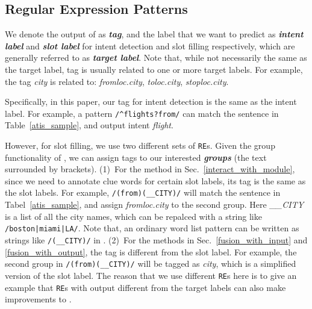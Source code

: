 \subsection{Regular Expression Patterns}
\label{re_desc}
We denote the output of \RE as \textbf{\emph{\RE tag}}, and the label that we want to predict as \textbf{\emph{intent label}} and \textbf{\emph{slot label}} for intent detection and slot filling respectively, which are generally referred to as \textbf{\emph{target label}}. 
Note that, while not necessarily the same as the target label, \RE tag is usually related to one or more target labels. For example, the \RE tag \emph{city} is related to: \emph{fromloc.city}, \emph{toloc.city}, \emph{stoploc.city}.

Specifically, in this paper, our \RE tag for intent detection is the same as the intent label. For example, a pattern 
\texttt{/\textasciicircum flights?\:from/} can match the sentence in Table~\ref{atis_sample}, and output intent \emph{flight}. 

However, for slot filling, we use two different sets of \texttt{RE}s. 
Given the group functionality of \RE, we can assign tags to our interested \textbf{\emph{\RE groups}} (the text surrounded by brackets). 
(1)~For the method in Sec.~\ref{interact_with_module}, since we need to annotate clue words for certain slot labels, its \RE tag is the same as the slot labels. 
For example, \texttt{/(from)\:(\_\_CITY)/} will match the sentence in Tabel~\ref{atis_sample}, and assign \emph{fromloc.city} to the second \RE group. 
Here \emph{\_\_CITY} is a list of all the city names, which can be repalced with a string like \texttt{/boston|miami|LA/}. 
Note that, an ordinary word list pattern can be written as strings like \texttt{/(\_\_CITY)/} in \RE.
(2)~For the methods in Sec.~\ref{fusion_with_input} and \ref{fusion_with_output}, the \RE tag is different from the slot label. For example, the second \RE group in \texttt{/(from)\:(\_\_CITY)/} will be tagged as \emph{city}, which is a simplified version of the slot label. The reason that we use different \texttt{RE}s here is to give an example that \texttt{RE}s with output different from the target labels can also make improvements to \NN.


